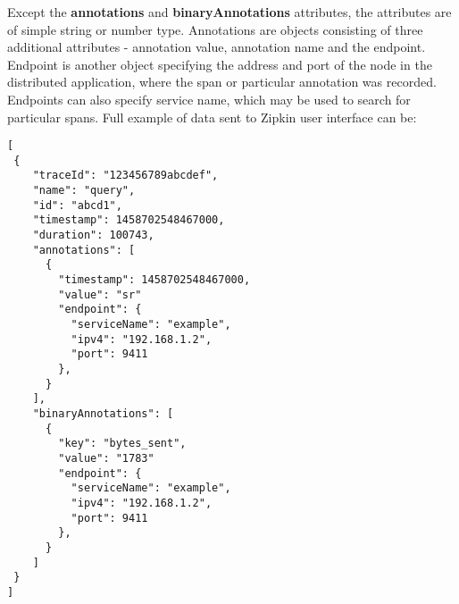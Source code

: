 Except the \textbf{annotations} and \textbf{binaryAnnotations} attributes, the attributes are of simple string or number type. Annotations are objects consisting of three additional attributes - annotation value, annotation name and the endpoint. Endpoint is another object specifying the address and port of the node in the distributed application, where the span or particular annotation was recorded. Endpoints can also specify service name, which may be used to search for particular spans. Full example of data sent to Zipkin user interface can be:
\begin{lstlisting}[emph={traceId, name, id, timestamp, duration, annotations, value, endpoint, serviceName, ipv4, port, binnaryAnnotations, key},emphstyle={\textbf}]
[
 {
    "traceId": "123456789abcdef",
    "name": "query",
    "id": "abcd1",
    "timestamp": 1458702548467000,
    "duration": 100743,
    "annotations": [
      {
        "timestamp": 1458702548467000,
        "value": "sr"
        "endpoint": {
          "serviceName": "example",
          "ipv4": "192.168.1.2",
          "port": 9411
        },
      }
    ],
    "binaryAnnotations": [
      {
        "key": "bytes_sent",
        "value": "1783"
        "endpoint": {
          "serviceName": "example",
          "ipv4": "192.168.1.2",
          "port": 9411
        },
      }
    ]
 }
]
\end{lstlisting}


